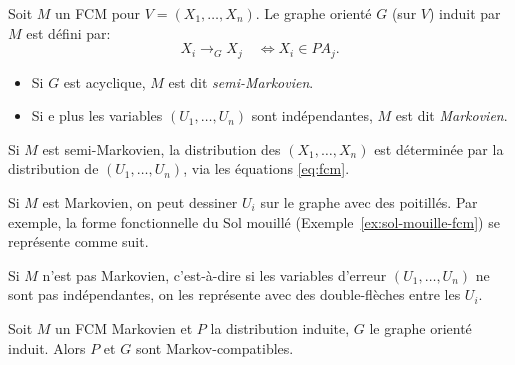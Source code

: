 \begin{definition}
  Soit $M$ un FCM pour $V=(X_1,\dots,X_n)$.
  Le graphe orienté $G$ (sur $V$) induit par $M$ est défini par:
\[ X_i\to_G X_j\quad \Longleftrightarrow X_i\in PA_j.  \]
\begin{itemize}
\item Si $G$ est acyclique, $M$ est dit \emph{semi-Markovien}.
\item Si e plus les variables $(U_1,\dots,U_n)$ sont indépendantes, $M$ est dit \emph{Markovien}.
\end{itemize}
\end{definition}
\begin{remark}
Si $M$ est semi-Markovien, la distribution des $(X_1,\dots,X_n)$ est
déterminée par la distribution de $(U_1,\dots,U_n)$, via les
équations \eqref{eq:fcm}.
\end{remark}
Si $M$ est Markovien, on peut dessiner $U_i$ sur le graphe avec
des poitillés. Par exemple, la forme fonctionnelle du Sol mouillé
(Exemple~\ref{ex:sol-mouille-fcm}) se représente comme suit.
\begin{center}
\end{center}
Si $M$ n'est pas Markovien, c'est-à-dire si les variables d'erreur
$(U_1,\dots,U_n)$ ne sont pas indépendantes, on les représente avec des
double-flèches entre les $U_i$.
\begin{center}
\end{center}

\begin{proposition}
  Soit $M$ un FCM Markovien et $P$ la distribution induite, $G$ le
  graphe orienté induit. Alors $P$ et $G$ sont Markov-compatibles.
\end{proposition}

